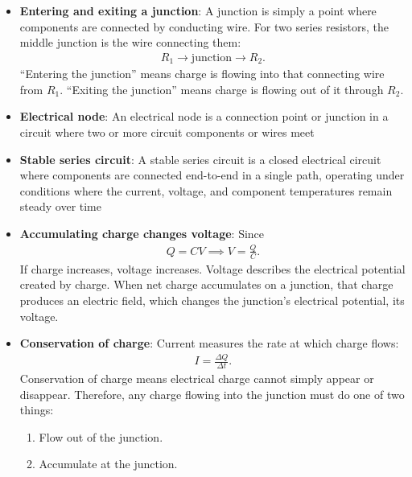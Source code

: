 \documentclass{report}
\begin{document}
\begin{itemize}
\begin{align*}
                V_{\text{tap}} = V_{\text{in}}\frac{\text{total resistance below the tap}}{\text{total resistance in the divider}}
            .\end{align*}
        \item \textbf{Entering and exiting a junction}: A junction is simply a point where components are connected by conducting wire. For two series resistors, the middle junction is the wire connecting them:
            \begin{align*}
                R_{1} \to \text{junction} \to R_{2}
            .\end{align*}
            “Entering the junction” means charge is flowing into that connecting wire from \(R_1\). “Exiting the junction” means charge is flowing out of it through \(R_2\).
        \item \textbf{Electrical node}: An electrical node is a connection point or junction in a circuit where two or more circuit components or wires meet
        \item \textbf{Stable series circuit}: A stable series circuit is a closed electrical circuit where components are connected end-to-end in a single path, operating under conditions where the current, voltage, and component temperatures remain steady over time
        \item \textbf{Accumulating charge changes voltage}: Since
            \begin{align*}
                Q = CV \implies V = \frac{Q}{C}
            .\end{align*}
            If charge increases, voltage increases. Voltage describes the electrical potential created by charge. When net charge accumulates on a junction, that charge produces an electric field, which changes the junction’s electrical potential, its voltage.
        \item \textbf{Conservation of charge}:  Current measures the rate at which charge flows:
            \begin{align*}
                I = \frac{\Delta Q}{\Delta t}
            .\end{align*}
            Conservation of charge means electrical charge cannot simply appear or disappear. Therefore, any charge flowing into the junction must do one of two things:
            \begin{enumerate}
                \item Flow out of the junction.
                \item Accumulate at the junction.
            \end{enumerate}

\end{itemize}
\end{document}
